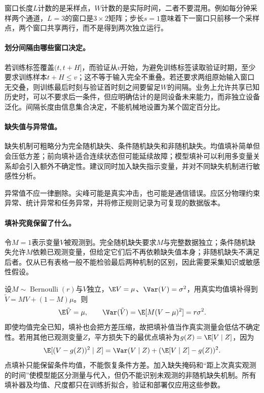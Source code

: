 窗口长度$L$计数的是采样点，$W$计数的是实际时间，二者不要混用。例如每分钟采样两个通道，$L=3$的窗口是$3\times2$矩阵；步长$s=1$意味着下一窗口只前移一个采样点，两个窗口共享两行，而不是得到两次独立运行。

\paragraph{划分间隔由哪些窗口决定。}
若训练标签覆盖$(t,t+H]$，而验证从$v$开始，为避免训练标签读取验证时期，至少要求训练样本$t+H\leq v$；这不等于输入完全不重叠。若还要求两组原始输入窗口无交叠，则训练最后时刻与验证首时刻之间要留足$W$的间隔。业务上允许共享已知历史时，可以不要求后一条件，但应明确估计的是同设备未来能力，而非独立设备泛化。间隔长度由信息集合决定，不能机械地设置为某个固定百分比。

\paragraph{缺失值与异常值。}
缺失机制可粗略分为完全随机缺失、条件随机缺失和非随机缺失。均值填补简单但会压低方差；前向填补适合连续状态但可能延续故障；模型填补可以利用多变量关系却会引入额外不确定性。建议同时加入缺失指示变量，并对不同缺失机制进行敏感性分析。

异常值不应一律删除。尖峰可能是真实冲击，也可能是通信错误。应区分物理约束异常、统计异常和任务异常，并将修正规则记录为可复现的数据版本。

\paragraph{填补究竟保留了什么。}
令$M=1$表示变量$V$被观测到。完全随机缺失要求$M$与完整数据独立；条件随机缺失允许$M$依赖已观测变量，但给定它们后不再依赖缺失值本身；非随机缺失不满足后者。仅从已有表格一般不能检验最后两种机制的区别，因此需要采集知识或敏感性假设。

设$M\sim\operatorname{Bernoulli}(r)$与$V$独立，$\E V=\mu$、$\Var(V)=\sigma^2$，用真实均值填补得到$\tilde V=MV+(1-M)\mu$。则
\begin{equation}
 \E\tilde V=\mu,\qquad
 \Var(\tilde V)=\E[M(V-\mu)^2]=r\sigma^2.
\end{equation}
即使均值完全已知，填补也会把方差压缩，故把填补值当作真实测量会低估不确定性。若用其他已观测变量$Z$，平方损失下的最优点填补为$g(Z)=\E[V\mid Z]$，因为
\begin{equation}
 \E[(V-g(Z))^2\mid Z]
 =\Var(V\mid Z)+(\E[V\mid Z]-g(Z))^2.
\end{equation}
点填补只能保留条件均值，不能恢复条件方差。加入缺失掩码和“距上次真实观测的时间”使模型能区分测量与代入，但仍不能识别未观测的非随机缺失机制。所有填补器及均值、尺度都只在训练折拟合，验证和部署仅应用这些参数。


